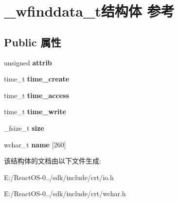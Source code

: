 \hypertarget{struct__wfinddata__t}{}\section{\+\_\+wfinddata\+\_\+t结构体 参考}
\label{struct__wfinddata__t}
\subsection*{Public 属性}
\begin{DoxyCompactItemize}
\item 
\mbox{\label{struct__wfinddata__t_af33dcec0e30ad137256c3e1c2057d486}} 
unsigned {\bfseries attrib}
\item 
\mbox{\label{struct__wfinddata__t_adce9d89b6c6425c431d7f2f756417f46}} 
time\+\_\+t {\bfseries time\+\_\+create}
\item 
\mbox{\label{struct__wfinddata__t_a4c5a3e27a6ad3174b9a14f045728edf8}} 
time\+\_\+t {\bfseries time\+\_\+access}
\item 
\mbox{\label{struct__wfinddata__t_ae24ac9da482054d4de139d999f9b4209}} 
time\+\_\+t {\bfseries time\+\_\+write}
\item 
\mbox{\label{struct__wfinddata__t_a5746082d7ce7a0a352bc78b676baed78}} 
\+\_\+fsize\+\_\+t {\bfseries size}
\item 
\mbox{\label{struct__wfinddata__t_afaa3c10a01b1695b0c75dc5d1edf6802}} 
wchar\+\_\+t {\bfseries name} \mbox{[}260\mbox{]}
\end{DoxyCompactItemize}


该结构体的文档由以下文件生成\+:\begin{DoxyCompactItemize}
\item 
E\+:/\+React\+O\+S-\/0../sdk/include/crt/io.\+h\item 
E\+:/\+React\+O\+S-\/0../sdk/include/crt/wchar.\+h\end{DoxyCompactItemize}
